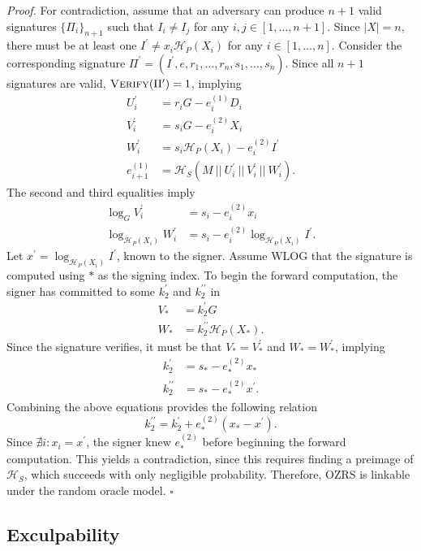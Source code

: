 \documentclass{article}
\newcommand{\algoname}[1]{\textnormal{\textsc{#1}}}
\newcommand{\verify}{\algoname{Verify}}
\newcommand{\sidx}{\ensuremath{*}}
\newcommand{\ix}{\ensuremath{x_i}}
\newcommand{\sx}{\ensuremath{x_\sidx}}
\newcommand{\ipk}{\ensuremath{X_i}}
\newcommand{\spk}{\ensuremath{X_\sidx}}
\newcommand{\hs}{\ensuremath{\mathcal{H}_S}}
\newcommand{\hp}{\ensuremath{\mathcal{H}_P}}
\newcommand{\qed}{\hfill\ensuremath{\square}}
\begin{document}
{\it Proof.} For contradiction, assume that an adversary can produce $n+1$ valid
signatures $\{\Pi_i\}_{n+1}$ such that $I_i \neq I_j$ for any $i,j \in
[1,\dots,n+1]$.  Since $|X| = n$, there must be at least one $I^\prime \neq \ix
\hp( \ipk )$ for any $i \in [1,\dots,n]$. Consider the corresponding signature
$\Pi^\prime = (I^\prime, e, r_1, \dots, r_n, s_1, \dots, s_n)$.  Since all $n+1$
signatures are valid, $\verify(\Pi^\prime)=1$, implying
\begin{align*}
  U_i^\prime &= r_i G - e_i^{(1)} D_i \\
  V_i^\prime &= s_i G - e_i^{(2)} \ipk \\
  W_i^\prime &= s_i \hp(\ipk) - e_i^{(2)} I^\prime \\
  e_{i+1}^{(1)} &= \hs( M ~ || ~ U_i^\prime ~ || ~ V_i^\prime ~ || ~ W_i^\prime).
\end{align*}
The second and third equalities imply
\begin{align*}
  \log_G V_i^\prime &= s_i - e_i^{(2)} \ix \\
  \log_{\hp(\ipk)} W_i^\prime &= s_i - e_i^{(2)} \log_{\hp(\ipk)} I^\prime.
\end{align*}
Let $x^\prime = \log_{\hp(\ipk)} I^\prime$, known to the signer.  Assume WLOG
that the signature is computed using $*$ as the signing index.  To begin the
forward computation, the signer has committed to some $k_2^\prime$ and
$k_2^{\prime\prime}$ in
\begin{align*}
  V_* &= k_2^\prime G \\
  W_* &= k_2^{\prime\prime} \hp(\spk).
\end{align*}
Since the signature verifies, it must be that $V_* = V_*^\prime$ and $W_* =
W_*^\prime$, implying
\begin{align*}
  k_2^\prime &= s_* - e_*^{(2)} \sx \\
  k_2^{\prime\prime} &= s_* - e_*^{(2)} x^\prime.
\end{align*}
Combining the above equations provides the following relation
\[
  k_2^{\prime\prime} = k_2^\prime + e_*^{(2)}(\sx - x^\prime).
\]
Since $\nexists i : x_i = x^\prime$, the signer knew $e_*^{(2)}$ before
beginning the forward computation.  This yields a contradiction, since this
requires finding a preimage of {\hs}, which succeeds with only negligible
probability.  Therefore, OZRS is linkable under the random oracle model. \qed

\subsection{Exculpability}
\end{document}

